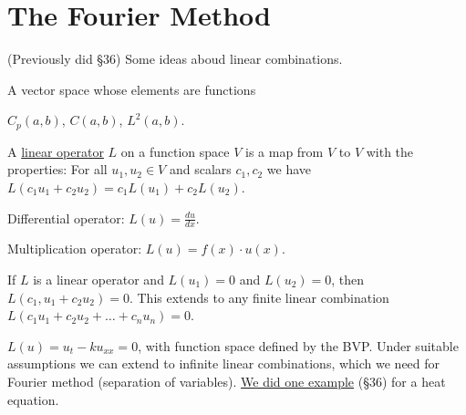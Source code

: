 \documentclass[]{article}
\begin{document}
\section{The Fourier Method}
(Previously did \S36)
Some ideas aboud linear combinations.
\begin{definition}
	 A vector space whose elements are functions
\end{definition}
\begin{example}
	$C_p(a,b)$, $C(a,b)$, $L^2(a,b)$.
\end{example}
\begin{definition}
	 A \underline{linear operator} $L$ on a function space $V$ is a map from $V$ to $V$ with the properties:
	For all $u_1,u_2\in V$ and scalars $c_1,c_2$ we have $L(c_1u_1+c_2u_2) = c_1L(u_1)+c_2L(u_2)$.
\end{definition}
\begin{example}
	Differential operator: $L(u) = \frac{du}{dx}$.
\end{example}
\begin{example}
	Multiplication operator: $L(u) = f(x)\cdot u(x)$.
\end{example}
\begin{definition}
	 If $L$ is a linear operator and $L(u_1)=0$ and $L(u_2) = 0$, then $L(c_1,u_1+c_2u_2) =0$. This extends to any finite linear combination $L(c_1u_1+c_2u_2+\dots+c_nu_n) = 0$.
\end{definition}
\begin{example}
	$L(u)=u_t-ku_{xx}=0$, with function space defined  by the BVP.
	Under suitable assumptions we can extend to infinite linear combinations, which we need for Fourier method (separation of variables).
	\underline{We did one example} (\S 36) for a heat equation.
\end{example}
\end{document}
